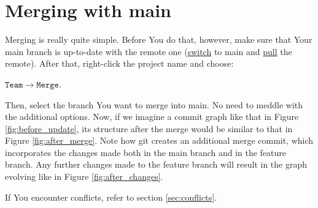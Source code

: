 \documentclass{article}
\begin{document}
\section{Merging with main}
\label{sec:merging}
Merging is really quite simple. Before You do that, however, make sure that Your main branch is up-to-date with the remote one (\hyperref[sec:switching]{switch} to main and \hyperref[sec:pulling]{pull} the remote). After that, right-click the project name and choose:\newline

$\mathtt{Team\rightarrow Merge}$.\newline

Then, select the branch You want to merge into main. No need to meddle with the additional options. Now, if we imagine a commit graph like that in Figure \ref{fig:before_update}, its structure after the merge would be similar to that in Figure \ref{fig:after_merge}. Note how git creates an additional merge commit, which incorporates the changes made both in the main branch and in the feature branch. Any further changes made to the feature branch will result in the graph evolving like in Figure \ref{fig:after_changes}.

If You encounter conflicts, refer to section \ref{sec:conflicts}.\newline
\end{document}
